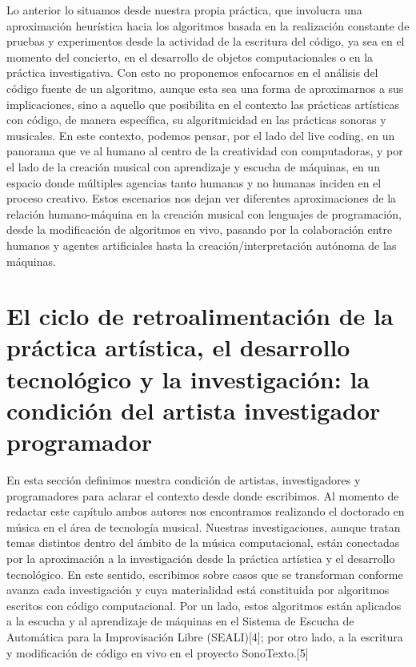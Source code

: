 Lo anterior lo situamos desde nuestra propia práctica, que involucra una aproximación heurística hacia los algoritmos basada en la realización constante de pruebas y experimentos desde la actividad de la escritura del código, ya sea
en el momento del concierto, en el desarrollo de objetos computacionales o en la práctica investigativa. Con esto no proponemos enfocarnos en el análisis del código fuente de un algoritmo, aunque esta sea una forma de aproximarnos a sus implicaciones, sino a aquello que posibilita en el contexto las prácticas artísticas con código, de manera específica, su algoritmicidad en las prácticas sonoras y musicales. En este contexto, podemos pensar, por el lado del live coding, en un panorama que ve al humano al centro de la creatividad con computadoras, y por el lado de la creación musical con aprendizaje y escucha de máquinas, en un espacio donde múltiples agencias tanto humanas y no humanas inciden en el proceso creativo. Estos escenarios nos dejan ver diferentes aproximaciones de la relación humano-máquina en la creación musical con lenguajes de programación, desde la modificación de algoritmos en vivo, pasando por la colaboración entre humanos y agentes artificiales hasta la creación/interpretación autónoma de las máquinas.


\section{El ciclo de retroalimentación de la práctica artística, el desarrollo tecnológico y la investigación: la condición del artista investigador programador}

En esta sección definimos nuestra condición de artistas, investigadores y programadores para aclarar el contexto desde donde escribimos. Al momento de redactar este capítulo ambos autores nos encontramos realizando el doctorado en música en el área de tecnología musical. Nuestras investigaciones, aunque tratan temas distintos dentro del ámbito de la música computacional, están conectadas por la aproximación a la investigación desde la práctica artística y el desarrollo tecnológico. En este sentido, escribimos sobre casos que se transforman conforme avanza cada investigación y cuya materialidad está constituida por algoritmos escritos con código computacional. Por un lado, estos algoritmos están aplicados a la escucha y al aprendizaje de máquinas en el Sistema de Escucha de Automática para la Improvisación Libre (SEALI)[4]; por otro lado, a la escritura y modificación de código en vivo en el proyecto SonoTexto.[5]

